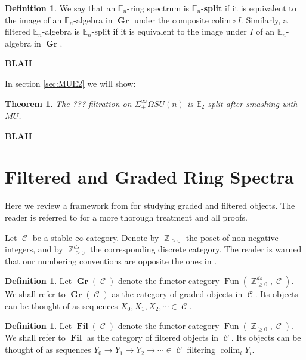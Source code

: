 \documentclass[reqno, oneside]{amsart}
\theoremstyle{definition}
\newtheorem{dfn}[nul]{Definition}
\theoremstyle{plain}
\newtheorem{thm}[nul]{Theorem}
\DeclareMathOperator*{\colim}{\text{colim}}
\DeclareMathOperator{\C}{\mathcal{C}}
\DeclareMathOperator{\Z}{\mathbb{Z}}
\DeclareMathOperator{\Gr}{\textbf{Gr}}
\DeclareMathOperator{\Fil}{\textbf{Fil}}
\DeclareMathOperator{\Fun}{\text{Fun}}
\begin{document}
\begin{dfn}
We say that an $\mathbb{E}_n$-ring spectrum is $\mathbb{E}_n$-\textbf{split} if it is equivalent to the image of an $\mathbb{E}_n$-algebra in $\Gr$ under the composite $\text{colim} \circ I.$  Similarly, a filtered $\mathbb{E}_n$-algebra is $\mathbb{E}_n$-split if it is equivalent to the image under $I$ of an $\mathbb{E}_n$-algebra in $\Gr$.
\end{dfn}

\textbf{BLAH}

In section \ref{sec:MUE2} we will show:
\begin{thm}
The ??? filtration on $\Sigma^{\infty}_+ \Omega SU(n)$ is $\mathbb{E}_2$-split after smashing with $MU$.
\end{thm}

\textbf{BLAH}



\section{Filtered and Graded Ring Spectra} \label{sec:FilGra}


Here we review a framework from \cite{LurieRot} for studying graded and filtered objects.  The reader is referred to \cite{LurieRot} for a more thorough treatment and all proofs.  

Let $\C$ be a stable $\infty$-category.  Denote by $\Z_{\geq 0}$ the poset of non-negative integers, and by $\Z_{\geq 0}^{ds}$ the corresponding discrete category.  The reader is warned that our numbering conventions are opposite the ones in \cite{LurieRot}.

\begin{dfn} 
Let $\Gr(\C)$ denote the functor category $\Fun(\Z_{\geq 0}^{ds}, \C).$  We shall refer to $\Gr(\C)$ as the category of graded objects in $\C$.  Its objects can be thought of as sequences $X_0, X_1,X_2,\cdots \in \C$.
\end{dfn}

 \begin{dfn} 
Let $\Fil(\C)$ denote the functor category $\Fun(\Z_{\geq 0}, \C).$  We shall refer to $\Fil$ as the category of filtered objects in $\C$.  Its objects can be thought of as sequences $Y_0\to Y_1\to Y_2 \to \cdots \in \C$ filtering $\colim_i Y_i$.  
 \end{dfn}
 
\end{document}
